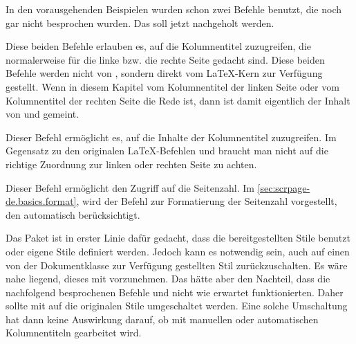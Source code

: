 In den vorausgehenden Beispielen wurden schon zwei Befehle benutzt, die noch
gar nicht besprochen wurden.  Das soll jetzt nachgeholt werden.

\begin{Declaration}
\end{Declaration}%
Diese beiden Befehle erlauben es, auf die Kolumnentitel zuzugreifen, die
normalerweise für die linke bzw. die rechte Seite gedacht sind. Diese beiden
Befehle werden nicht von , sondern direkt vom \LaTeX-Kern
zur Verfügung gestellt. Wenn in diesem Kapitel vom Kolumnentitel der linken
Seite oder vom Kolumnentitel der rechten Seite die Rede ist, dann ist damit
eigentlich der Inhalt von  und  gemeint.
%
\EndIndexGroup


\begin{Declaration}
\end{Declaration}%
Dieser Befehl ermöglicht es, auf die Inhalte der Kolumnentitel zuzugreifen.
Im Gegensatz zu den originalen \LaTeX{}-Befehlen  und
 braucht man nicht auf die richtige Zuordnung zur linken oder
rechten Seite zu achten.%
%
\EndIndexGroup


\begin{Declaration}
\end{Declaration}%
Dieser Befehl ermöglicht den Zugriff auf die Seitenzahl. Im
\autoref{sec:scrpage-de.basics.format}, 
wird der Befehl  zur Formatierung der Seitenzahl vorgestellt,
den  automatisch berücksichtigt.%
%
\EndIndexGroup


\begin{Declaration}
\end{Declaration}%
Das Paket  ist in erster Linie dafür gedacht, dass die
bereitgestellten Stile benutzt oder eigene Stile definiert werden.  Jedoch
kann es notwendig sein, auch auf einen von der Dokumentklasse zur Verfügung
gestellten Stil zurückzuschalten. Es wäre nahe liegend, dieses mit
 vorzunehmen. Das hätte aber den
Nachteil, dass die nachfolgend besprochenen Befehle  und
 nicht wie erwartet funktionierten. Daher sollte mit
 auf die
originalen Stile umgeschaltet werden. Eine solche Umschaltung hat dann keine
Auswirkung darauf, ob mit manuellen oder automatischen Kolumnentiteln
gearbeitet wird.%
%
\EndIndexGroup


